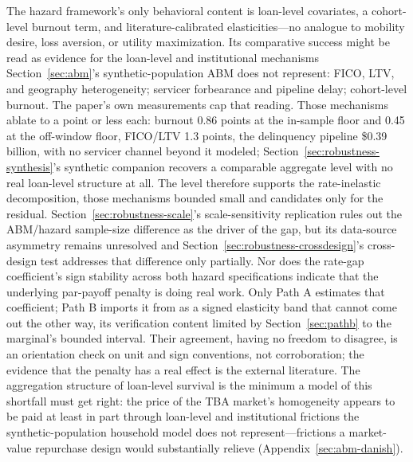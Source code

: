 The hazard framework's only behavioral content is loan-level covariates, a cohort-level burnout term, and literature-calibrated elasticities---no analogue to mobility desire, loss aversion, or utility maximization. Its comparative success might be read as evidence for the loan-level and institutional mechanisms Section~\ref{sec:abm}'s synthetic-population ABM does not represent: FICO, LTV, and geography heterogeneity; servicer forbearance and pipeline delay; cohort-level burnout. The paper's own measurements cap that reading. Those mechanisms ablate to a point or less each: burnout 0.86 points at the in-sample floor and 0.45 at the off-window floor, FICO/LTV 1.3 points, the delinquency pipeline \$0.39 billion, with no servicer channel beyond it modeled; Section~\ref{sec:robustness-synthesis}'s synthetic companion recovers a comparable aggregate level with no real loan-level structure at all. The level therefore supports the rate-inelastic decomposition, those mechanisms bounded small and candidates only for the residual. Section~\ref{sec:robustness-scale}'s scale-sensitivity replication rules out the ABM/hazard sample-size difference as the driver of the gap, but its data-source asymmetry remains unresolved and Section~\ref{sec:robustness-crossdesign}'s cross-design test addresses that difference only partially. Nor does the rate-gap coefficient's sign stability across both hazard specifications indicate that the underlying par-payoff penalty is doing real work. Only Path A estimates that coefficient; Path B imports it from \citet{liebersohn2024} as a signed elasticity band that cannot come out the other way, its verification content limited by Section~\ref{sec:pathb} to the marginal's bounded interval. Their agreement, having no freedom to disagree, is an orientation check on unit and sign conventions, not corroboration; the evidence that the penalty has a real effect is the external literature. The aggregation structure of loan-level survival is the minimum a model of this shortfall must get right: the price of the TBA market's homogeneity appears to be paid at least in part through loan-level and institutional frictions the synthetic-population household model does not represent---frictions a market-value repurchase design would substantially relieve (Appendix~\ref{sec:abm-danish}).
\clearpage

